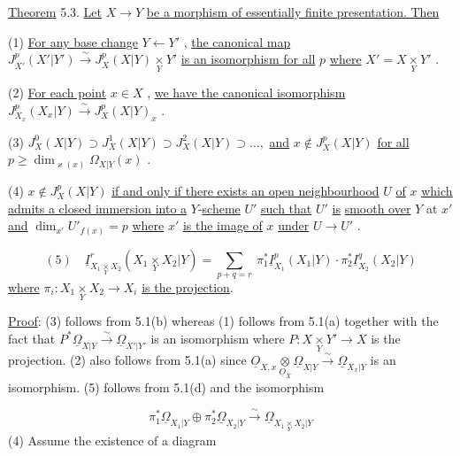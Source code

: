 \underline{Theorem} 5.3.  \underline{Let}  $X \to Y$  \underline{be a morphism of essentially finite presentation. Then}

(1)  \underline{For any base change}  $Y \leftarrow Y'$ , \underline{the canonical map} $J^p_{X'}(X'|Y') \xrightarrow{\sim} J^p_X(X|Y) \underset{Y}{\times} Y'$  \underline{is an isomorphism for all}  $p$  \underline{where}  $X' = X \underset{Y}{\times} Y'$ .

(2)  \underline{For each point}  $x \in X$ , \underline{we have the canonical isomorphism} $J^p_{X_x}(X_x|Y) \xrightarrow{\sim} J^p_X(X|Y)_x$ .

(3)  $J^0_X(X|Y) \supset J^1_X(X|Y) \supset J^2_X(X|Y) \supset \dots,$  \underline{and}  $x \notin J^p_X(X|Y)$  \underline{for all} $p \geq \dim_{\varkappa(x)} \Omega_{X|Y}(x)$ .

(4)  $x \notin J^p_X(X|Y)$  \underline{if and only if there exists an open neighbourhood}  $U$ \underline{of}  $x$  \underline{which admits a closed immersion into a}  $Y$-\underline{scheme}  $U'$  \underline{such that}  $U'$  \underline{is} \underline{smooth over}  $Y$  at  $x'$  \underline{and}  $\dim_{x'} U'_{f(x)} = p$  \underline{where}  $x'$  \underline{is the image of}  $x$  \underline{under} $U \to U'$ .

\begin{equation*}
(5) \quad \underline{I}^r_{X_1 \underset{Y}{\times} X_2}(X_1 \underset{Y}{\times} X_2 | Y) = \sum_{p+q=r} \ \pi_1^* \underline{I}^p_{X_1}(X_1|Y) \cdot \pi_2^* \underline{I}^q_{X_2}(X_2|Y)
\end{equation*}
\underline{where}  $\pi_i : X_1 \underset{Y}{\times} X_2 \to X_i$  \underline{is the projection}.

\underline{Proof}:  (3) follows from 5.1(b) whereas (1) follows from 5.1(a) together with the fact that  $P^*\underline{\Omega}_{X|Y} \xrightarrow{\sim} \underline{\Omega}_{X'|Y'}$  is an isomorphism where  $P : X \underset{Y}{\times} Y' \to X$  is the projection. (2) also follows from 5.1(a) since  $\underline{O}_{X,x} \underset{\underline{O}_X}{\otimes} \underline{\Omega}_{X|Y} \xrightarrow{\sim} \underline{\Omega}_{X_x|Y}$  is an isomorphism. (5) follows from 5.1(d) and the isomorphism

\begin{equation*}
\pi_1^*\underline{\Omega}_{X_1|Y} \oplus \pi_2^*\underline{\Omega}_{X_2|Y} \xrightarrow{\sim} \underline{\Omega}_{X_1 \underset{Y}{\times} X_2|Y}
\end{equation*}
(4)  Assume the existence of a diagram

